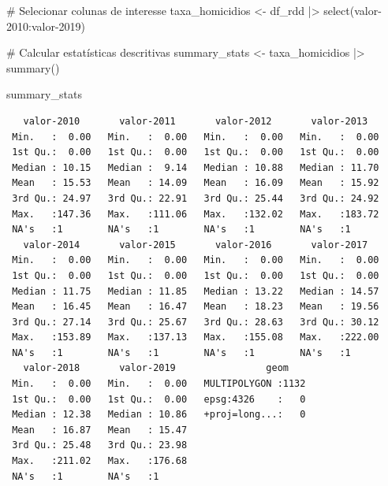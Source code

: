 \documentclass[
  letterpaper,
  DIV=11,
  numbers=noendperiod]{scrartcl}
\newenvironment{Shaded}{\begin{snugshade}}{\end{snugshade}}
\newcommand{\AttributeTok}[1]{\textcolor[rgb]{0.40,0.45,0.13}{#1}}
\newcommand{\CommentTok}[1]{\textcolor[rgb]{0.37,0.37,0.37}{#1}}
\newcommand{\FunctionTok}[1]{\textcolor[rgb]{0.28,0.35,0.67}{#1}}
\newcommand{\NormalTok}[1]{\textcolor[rgb]{0.00,0.23,0.31}{#1}}
\newcommand{\OtherTok}[1]{\textcolor[rgb]{0.00,0.23,0.31}{#1}}
\newcommand{\SpecialCharTok}[1]{\textcolor[rgb]{0.37,0.37,0.37}{#1}}
\newcommand{\StringTok}[1]{\textcolor[rgb]{0.13,0.47,0.30}{#1}}
\begin{document}
\begin{Shaded}
\begin{Highlighting}[]
\CommentTok{\# Selecionar colunas de interesse}
\NormalTok{taxa\_homicidios }\OtherTok{\textless{}{-}}\NormalTok{ df\_rdd }\SpecialCharTok{|\textgreater{}} 
  \FunctionTok{select}\NormalTok{(}\StringTok{\textasciigrave{}}\AttributeTok{valor{-}2010}\StringTok{\textasciigrave{}}\SpecialCharTok{:}\StringTok{\textasciigrave{}}\AttributeTok{valor{-}2019}\StringTok{\textasciigrave{}}\NormalTok{)}

\CommentTok{\# Calcular estatísticas descritivas}
\NormalTok{summary\_stats }\OtherTok{\textless{}{-}}\NormalTok{ taxa\_homicidios  }\SpecialCharTok{|\textgreater{}} 
  \FunctionTok{summary}\NormalTok{()}

\NormalTok{summary\_stats}
\end{Highlighting}
\end{Shaded}

\begin{verbatim}
   valor-2010       valor-2011       valor-2012       valor-2013    
 Min.   :  0.00   Min.   :  0.00   Min.   :  0.00   Min.   :  0.00  
 1st Qu.:  0.00   1st Qu.:  0.00   1st Qu.:  0.00   1st Qu.:  0.00  
 Median : 10.15   Median :  9.14   Median : 10.88   Median : 11.70  
 Mean   : 15.53   Mean   : 14.09   Mean   : 16.09   Mean   : 15.92  
 3rd Qu.: 24.97   3rd Qu.: 22.91   3rd Qu.: 25.44   3rd Qu.: 24.92  
 Max.   :147.36   Max.   :111.06   Max.   :132.02   Max.   :183.72  
 NA's   :1        NA's   :1        NA's   :1        NA's   :1       
   valor-2014       valor-2015       valor-2016       valor-2017    
 Min.   :  0.00   Min.   :  0.00   Min.   :  0.00   Min.   :  0.00  
 1st Qu.:  0.00   1st Qu.:  0.00   1st Qu.:  0.00   1st Qu.:  0.00  
 Median : 11.75   Median : 11.85   Median : 13.22   Median : 14.57  
 Mean   : 16.45   Mean   : 16.47   Mean   : 18.23   Mean   : 19.56  
 3rd Qu.: 27.14   3rd Qu.: 25.67   3rd Qu.: 28.63   3rd Qu.: 30.12  
 Max.   :153.89   Max.   :137.13   Max.   :155.08   Max.   :222.00  
 NA's   :1        NA's   :1        NA's   :1        NA's   :1       
   valor-2018       valor-2019                geom     
 Min.   :  0.00   Min.   :  0.00   MULTIPOLYGON :1132  
 1st Qu.:  0.00   1st Qu.:  0.00   epsg:4326    :   0  
 Median : 12.38   Median : 10.86   +proj=long...:   0  
 Mean   : 16.87   Mean   : 15.47                       
 3rd Qu.: 25.48   3rd Qu.: 23.98                       
 Max.   :211.02   Max.   :176.68                       
 NA's   :1        NA's   :1                            
\end{verbatim}
\end{document}
